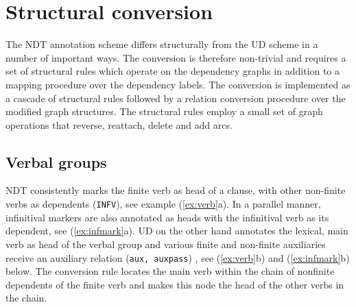 \documentclass[11pt,a4paper]{article}
\begin{document}
\section{Structural conversion}
The NDT annotation scheme differs structurally from the UD scheme in
a number of important ways.  The conversion is therefore non-trivial
and requires a set of structural rules which operate on the dependency
graphs in addition to a mapping procedure over the dependency labels.
The conversion is implemented as a cascade of structural rules followed by a
relation conversion procedure over the modified graph structures.
The structural rules employ a small set of graph operations that reverse, reattach, delete and add arcs.

\subsection{Verbal groups}
NDT consistently marks the finite verb as head of a clause, with other
non-finite verbs as dependents ({\tt INFV}), see example
(\ref{ex:verb}a). In a parallel manner, infinitival markers are also
annotated as heads with the infinitival verb as its dependent, see
(\ref{ex:infmark}a). UD on the other hand annotates the lexical, main
verb as head of the verbal group and various finite and non-finite
auxiliaries receive an auxiliary relation ({\tt aux, auxpass}) , see
(\ref{ex:verb}b) and (\ref{ex:infmark}b) below.  The conversion rule
locates the main verb within the chain of nonfinite dependents of the
finite verb and makes this node the head of the other verbs in the
chain.
\end{document}
